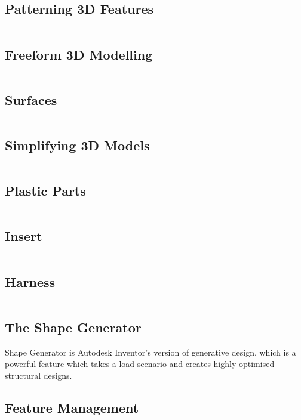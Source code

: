 \subsection{Patterning 3D Features}

$ $

\subsection{Freeform 3D Modelling}

$ $

\subsection{Surfaces}
\label{subsection: 3D Model Surface}

$ $

\subsection{Simplifying 3D Models}

$ $

\subsection{Plastic Parts}

$ $

\subsection{Insert}

$ $

\subsection{Harness}

$ $

\subsection{The Shape Generator}
Shape Generator is Autodesk Inventor's version of generative design, which is a powerful feature which takes a load scenario and creates highly optimised structural designs.

\subsection{Feature Management}
